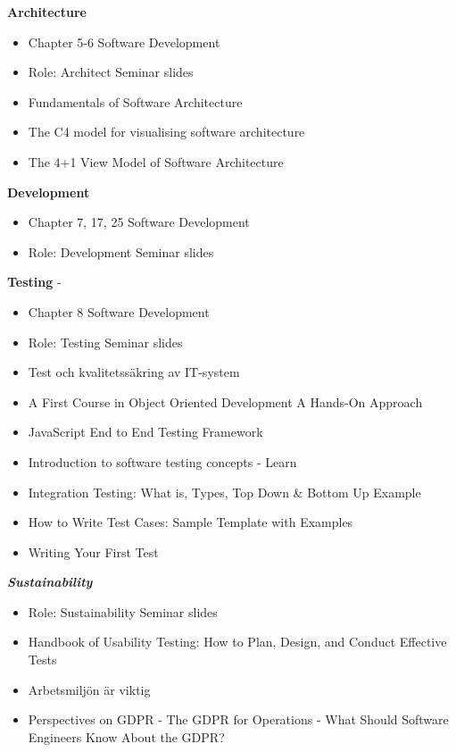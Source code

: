 \textbf{Architecture}
\begin{itemize}
    \item Chapter 5-6 Software Development \cite{ian_sommerville_software_nodate}
    \item Role: Architect Seminar slides  \cite{tanyingyong_roll_nodate}
    \item Fundamentals of Software Architecture \cite{richards_fundamentals_2020}
    \item The C4 model for visualising software architecture \cite{brown_c4_nodate}
    \item The 4+1 View Model of Software Architecture \cite{kruchten_architectural_nodate}
\end{itemize}

\textbf{Development}
\begin{itemize}
    \item Chapter 7, 17, 25 Software Development \cite{ian_sommerville_software_nodate}
    \item Role: Development Seminar slides
\end{itemize}

\textbf{Testing} -
\begin{itemize}
    \item Chapter 8 Software Development \cite{ian_sommerville_software_nodate}
    \item Role: Testing Seminar slides  
    \item Test och kvalitetssäkring av IT-system \cite{eriksson_test_2008}
    \item A First Course in Object Oriented Development A Hands-On Approach \cite{lindback_first_2022}
    \item JavaScript End to End Testing Framework \cite{noauthor_javascript_nodate}
    \item Introduction to software testing concepts - Learn \cite{kendrahavens_introduction_nodate}
    \item Integration Testing: What is, Types, Top Down & Bottom Up Example \cite{hamilton_integration_2020}
    \item How to Write Test Cases: Sample Template with Examples \cite{hamilton_how_2020}
    \item Writing Your First Test \cite{noauthor_writing_nodate}
\end{itemize}

\textit{\textbf{Sustainability}}
\begin{itemize}
    \item Role: Sustainability Seminar slides  \cite{lundevall_rollen_nodate}
    \item Handbook of Usability Testing: How to Plan, Design, and Conduct Effective Tests \cite{rubin_handbook_2011}
    \item Arbetsmiljön är viktig \cite{noauthor_arbetsmiljon_nodate}
    \item Perspectives on GDPR - The GDPR for  Operations - What Should Software Engineers Know About the GDPR? \cite{pais_perspectives_nodate}

\end{itemize}

